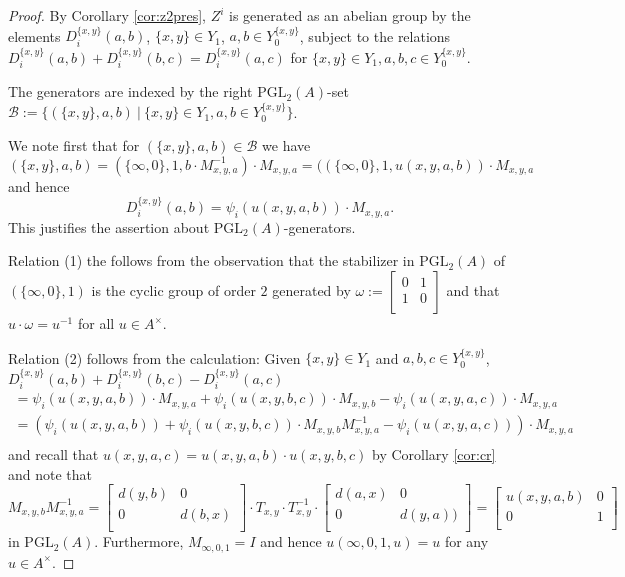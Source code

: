 \documentclass[12pt]{amsart}
\theoremstyle{definition}
\newcommand{\pgl}[2]{\mathrm{PGL}_{#1}(#2)}
\newcommand{\suss}[2]{\psi_{#1}\left( #2\right)}
\newcommand{\<}{\langle}
\renewcommand{\>}{\rangle}
\begin{document}
\begin{proof} By Corollary \ref{cor:z2pres}, $Z^i$ is generated as an abelian group by the elements $D_i^{\{ x,y\}}(a,b)$, $\{ x,y\}\in Y_1$, $a,b\in Y^{\{ x,y\}}_0$,
 subject to the relations $D_i^{\{ x,y\}}(a,b)+D_i^{\{ x,y\}}(b,c)=D_i^{\{ x,y\}}(a,c)$   for $\{x,y\}\in Y_1, a,b,c\in Y^{\{ x,y\}}_0$.

The generators are indexed by the right $\pgl{2}{A}$-set $\mathcal{B}:= \{ (\{x,y\}, a,b)\ |\ \{ x,y\}\in Y_1, a,b\in  Y^{\{ x,y\}}_0\}$. 

We note first that for 
$(\{ x,y\}, a,b)\in\mathcal{B}$ we have 
\[
(\{ x,y\}, a,b)=(\{\infty,0\},1,b\cdot M_{x,y,a}^{-1})\cdot M_{x,y,a}=((\{\infty,0\},1,u(x,y,a,b))\cdot M_{x,y,a}
\]
and hence
\[
D_i^{\{ x,y\}}(a,b)=\suss{i}{u(x,y,a,b)}\cdot M_{x,y,a}.
\]
This justifies the assertion about $\pgl{2}{A}$-generators. 

Relation (1) the follows from the observation that the stabilizer in $\pgl{2}{A}$ of $(\{ \infty,0\},1)$ is the cyclic group of order $2$ generated by ${\omega}:=
\left[
\begin{array}{cc}
0&1\\
1&0\\
\end{array}
\right]$ and that $u\cdot \omega=u^{-1}$ for all $u\in A^\times$. 

Relation (2) follows from the calculation: Given $\{x,y\}\in Y_1$ and $ a,b,c\in Y^{\{ x,y\}}_0$,\\
$D_i^{\{ x,y\}}(a,b)+D_i^{\{ x,y\}}(b,c)-D_i^{\{ x,y\}}(a,c)$
\begin{eqnarray*}
=\suss{i}{u(x,y,a,b)}\cdot M_{x,y,a}+\suss{i}{u(x,y,b,c)}\cdot M_{x,y,b}-\suss{i}{u(x,y,a,c)}\cdot M_{x,y,a}\\
=\left(
 \suss{i}{u(x,y,a,b)}+\suss{i}{u(x,y,b,c)}\cdot M_{x,y,b}M_{x,y,a}^{-1}-\suss{i}{u(x,y,a,c)}
\right)\cdot M_{x,y,a}\\
\end{eqnarray*}
and recall that $u(x,y,a,c)=u(x,y,a,b)\cdot u(x,y,b,c)$ by Corollary \ref{cor:cr} and note that 
\[
 M_{x,y,b}M_{x,y,a}^{-1}= \left[
\begin{array}{cc}
d(y,b)&0\\
0&d(b,x)\\
\end{array}
\right]\cdot T_{x,y}\cdot T_{x,y}^{-1}\cdot
\left[
\begin{array}{cc}
d(a,x)&0\\
0&d(y,a))\\
\end{array}
\right]=
\left[
\begin{array}{cc}
u(x,y,a,b)&0\\
0&1\\
\end{array}
\right]
\]
in $\pgl{2}{A}$. Furthermore, $M_{\infty,0,1}=I$ and hence $u(\infty,0,1,u)=u$ for any $u\in A^\times$.
\end{proof}
\end{document}
